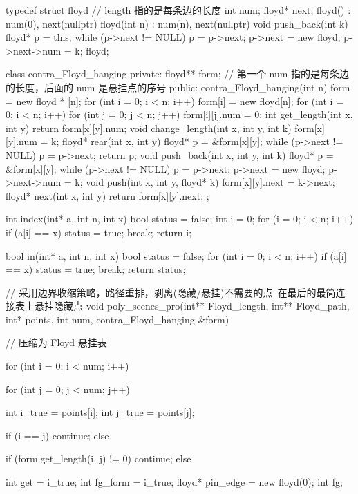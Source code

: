 \documentclass[withoutpreface,bwprint]{cumcmthesis} %
\begin{document}
\begin{appendices}
\begin{tcode}

typedef struct floyd{
	// length 指的是每条边的长度
	int num;
	floyd* next;
	floyd() : num(0), next(nullptr) {}
	floyd(int n) : num(n), next(nullptr) {}
	void push_back(int k) {
		floyd* p = this;
		while (p->next != NULL) p = p->next;
		p->next = new floyd;
		p->next->num = k;
	}
}floyd;

class contra_Floyd_hanging {
private:
	floyd** form;
	// 第一个 num 指的是每条边的长度，后面的 num 是悬挂点的序号
public:
	contra_Floyd_hanging(int n) {
		form = new floyd * [n];
		for (int i = 0; i < n; i++) {
			form[i] = new floyd[n];
		}
		for (int i = 0; i < n; i++) {
			for (int j = 0; j < n; j++) {
				form[i][j].num = 0;
			}
		}
	}
	int get_length(int x, int y) {
		return form[x][y].num;
	}
	void change_length(int x, int y, int k) {
		form[x][y].num = k;
	}
	floyd* rear(int x, int y) {
		floyd* p = &form[x][y];
		while (p->next != NULL) p = p->next;
		return p;
	}
	void push_back(int x, int y, int k) {
		floyd* p = &form[x][y];
		while (p->next != NULL) p = p->next;
		p->next = new floyd;
		p->next->num = k;
	}
	void push(int x, int y, floyd* k) {
		form[x][y].next = k->next;
	}
	floyd* next(int x, int y) {
		return form[x][y].next;
	}
};

int index(int* a, int n, int x) {
	bool status = false;
	int i = 0;
	for (i = 0; i < n; i++) {
		if (a[i] == x) {
			status = true;
			break;
		}
	}
	return i;
}

bool in(int* a, int n, int x) {
	bool status = false;
	for (int i = 0; i < n; i++) {
		if (a[i] == x) {
			status = true;
			break;
		}
	}
	return status;
}


// 采用边界收缩策略，路径重排，剥离(隐藏/悬挂)不需要的点--在最后的最简连接表上悬挂隐藏点
void poly_scenes_pro(int** Floyd_length, int** Floyd_path, int* points, int num, contra_Floyd_hanging &form) {
	// 压缩为 Floyd 悬挂表

	for (int i = 0; i < num; i++) {
		for (int j = 0; j < num; j++) {
			int i_true = points[i];
			int j_true = points[j];

			if (i == j) continue;
			else {
				if (form.get_length(i, j) != 0) continue;
				else {
					int get = i_true;
					int fg_form = i_true;
					floyd* pin_edge = new floyd(0);
					int fg;

}}}}}
\end{tcode}
\end{appendices}
\end{document}
